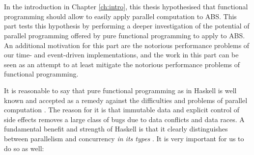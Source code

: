 \chapter*{} %
\label{ch:parallel_abs}
In the introduction in Chapter \ref{ch:intro}, this thesis hypothesised that functional programming should allow to easily apply parallel computation to ABS. This part tests this hypothesis by performing a deeper investigation of the potential of parallel programming offered by pure functional programming to apply to ABS. An additional motivation for this part are the notorious performance problems of our time- and event-driven implementations, and the work in this part can be seen as an attempt to at least mitigate the notorious performance problems of functional programming.

\medskip

It is reasonable to say that pure functional programming as in Haskell is well known and accepted as a remedy against the difficulties and problems of parallel computation \cite{hudak_history_2007}. The reason for it is that immutable data and explicit control of side effects removes a large class of bugs due to data conflicts and data races. A fundamental benefit and strength of Haskell is that it clearly distinguishes between parallelism and concurrency \textit{in its types} \cite{jones_tackling_2002}. It is very important for us to do so as well:

